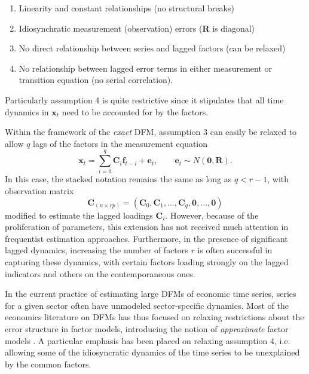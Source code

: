 \documentclass[a4paper]{article}
\begin{document}
\begin{enumerate}
\item Linearity and constant relationships (no structural breaks)
\item Idiosynchratic measurement (observation) errors (\textbf{R} is diagonal)
\item No direct relationship between series and lagged factors (can be relaxed)
\item No relationship between lagged error terms in either measurement or transition equation (no serial correlation).
\end{enumerate}

Particularly assumption 4 is quite restrictive since it stipulates that all time dynamics in $\textbf{x}_t$ need to be accounted for by the factors. \newline

Within the framework of the \emph{exact} DFM, assumption 3 can easily be relaxed to allow $q$ lags of the factors in the measurement equation
\begin{equation}
\textbf{x}_t = \sum_{i=0}^q \textbf{C}_i \textbf{f}_{t-i} + \textbf{e}_t, \qquad \textbf{e}_t\sim N(\textbf{0}, \textbf{R}).
\end{equation}
In this case, the stacked notation remains the same as long as $q < r-1$, with observation matrix 
\begin{equation} \label{eq:Clags}
\textbf{C}_{(n \times rp)}  = (\textbf{C}_0, \textbf{C}_1, \dots, \textbf{C}_q, \textbf{0}, \dots, \textbf{0})
\end{equation}
modified to estimate the lagged loadings $\textbf{C}_i$. However, because of the proliferation of parameters, this extension has not received much attention in frequentist estimation approaches. Furthermore, in the presence of significant lagged dynamics, increasing the number of factors $r$ is often successful in capturing these dynamics, with certain factors loading strongly on the lagged indicators and others on the contemporaneous ones. \newline


In the current practice of estimating large DFMs of economic time series, series for a given sector often have unmodeled sector-specific dynamics. Most of the economics literature on DFMs has thus focused on relaxing restrictions about the error structure in factor models, introducing the notion of \emph{approximate} factor models \citep{stock2016dynamic}. A particular emphasis has been placed on relaxing assumption 4, i.e. allowing some of the idiosyncratic dynamics of the time series to be unexplained by the common factors. 
\end{document}
